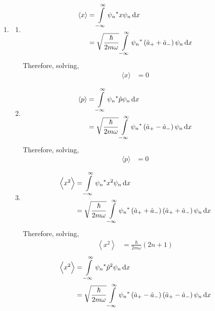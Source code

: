 \documentclass[fleqn, a4paper, 11pt, oneside]{amsart}
\theoremstyle{definition}
\theoremstyle{theorem}
\begin{document}
\begin{solution}
	\begin{enumerate}[leftmargin=*]
		\item
			\begin{enumerate}[leftmargin=*]
				\item
					\begin{align*}
						\langle x \rangle & = \int\limits_{-\infty}^{\infty} {\psi_n}^* x \psi_n \dif x \\
                                                                  & = \sqrt{\frac{\hbar}{2 m \omega}} \int\limits_{-\infty}^{\infty} {\psi_n}^* \left( \hat{a}_+ + \hat{a}_- \right) \psi_n \dif x
					\end{align*}
					Therefore, solving,
					\begin{align*}
						\langle x \rangle & = 0
					\end{align*}
				\item
					\begin{align*}
						\langle p \rangle & = \int\limits_{-\infty}^{\infty} {\psi_n}^* \hat{p} \psi_n \dif x \\
                                                                  & = \sqrt{\frac{\hbar}{2 m \omega}} \int\limits_{-\infty}^{\infty} {\psi_n}^* \left( \hat{a}_+ - \hat{a}_- \right) \psi_n \dif x
					\end{align*}
					Therefore, solving,
					\begin{align*}
						\langle p \rangle & = 0
					\end{align*}
				\item
					\begin{align*}
						\left\langle x^2 \right\rangle & = \int\limits_{-\infty}^{\infty} {\psi_n}^* x^2 \psi_n \dif x \\
                                                                               & = \sqrt{\frac{\hbar}{2 m \omega}} \int\limits_{-\infty}^{\infty} {\psi_n}^* \left( \hat{a}_+ + \hat{a}_- \right) \left( \hat{a}_+ + \hat{a}_- \right) \psi_n \dif x
					\end{align*}
					Therefore, solving,
					\begin{align*}
						\left\langle x^2 \right\rangle & = \frac{\hbar}{2 m \omega} (2 n + 1)
					\end{align*}
					\begin{align*}
						\left\langle x^2 \right\rangle & = \int\limits_{-\infty}^{\infty} {\psi_n}^* \hat{p}^2 \psi_n \dif x \\
                                                                               & = \sqrt{\frac{\hbar}{2 m \omega}} \int\limits_{-\infty}^{\infty} {\psi_n}^* \left( \hat{a}_+ - \hat{a}_- \right) \left( \hat{a}_+ - \hat{a}_- \right) \psi_n \dif x

\end{align*}
\end{enumerate}
\end{enumerate}
\end{solution}
\end{document}
